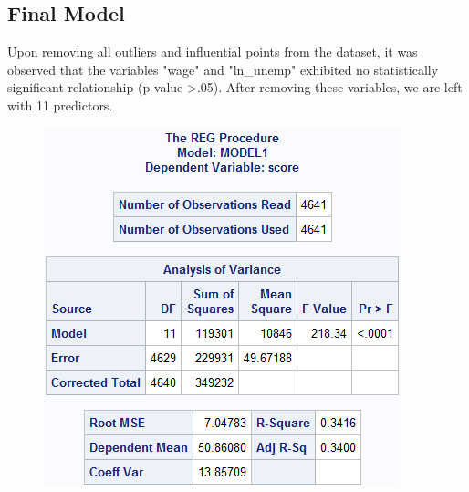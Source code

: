 \documentclass[12pt]{article}
\begin{document}
\subsection{Final Model}
Upon removing all outliers and influential points from the dataset, it was observed that the variables "wage" and "ln\_unemp" exhibited no statistically significant relationship (p-value \textgreater .05). After removing these variables, we are left with 11 predictors.
\begin{figure}[h]
    \centering
    \begin{minipage}[t]{0.4\textwidth}
        \vspace{10pt}
        \centering
        \includegraphics[width=\textwidth]{images/final_model1.png}
        \label{fig:unemp_dist}
    \end{minipage}\hfill
    \begin{minipage}[t]{0.55\textwidth}
        \vspace{0pt}
        \centering

\end{minipage}
\end{figure}
\end{document}
